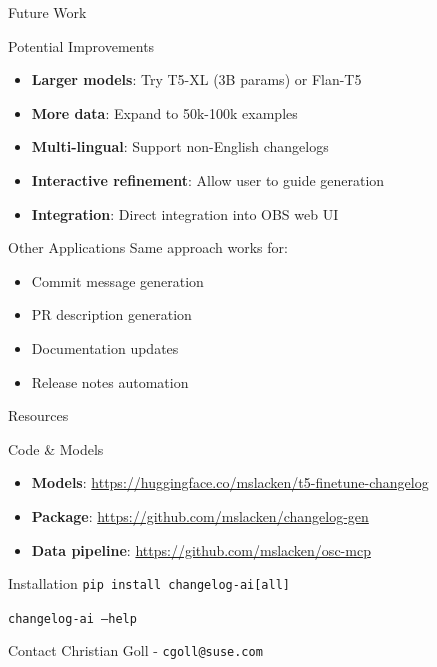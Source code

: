 \begin{frame}{Future Work}
\begin{block}{Potential Improvements}
\begin{itemize}
  \item \textbf{Larger models}: Try T5-XL (3B params) or Flan-T5
  \item \textbf{More data}: Expand to 50k-100k examples
  \item \textbf{Multi-lingual}: Support non-English changelogs
  \item \textbf{Interactive refinement}: Allow user to guide generation
  \item \textbf{Integration}: Direct integration into OBS web UI
\end{itemize}
\end{block}

\begin{block}{Other Applications}
Same approach works for:
\begin{itemize}
  \item Commit message generation
  \item PR description generation
  \item Documentation updates
  \item Release notes automation
\end{itemize}
\end{block}
\end{frame}

\begin{frame}{Resources}
\begin{block}{Code \& Models}
\begin{itemize}
  \item \textbf{Models}: \url{https://huggingface.co/mslacken/t5-finetune-changelog}
  \item \textbf{Package}: \url{https://github.com/mslacken/changelog-gen}
  \item \textbf{Data pipeline}: \url{https://github.com/mslacken/osc-mcp}
\end{itemize}
\end{block}

\begin{block}{Installation}
\texttt{pip install changelog-ai[all]}

\texttt{changelog-ai --help}
\end{block}

\begin{block}{Contact}
Christian Goll - \texttt{cgoll@suse.com}
\end{block}
\end{frame}


